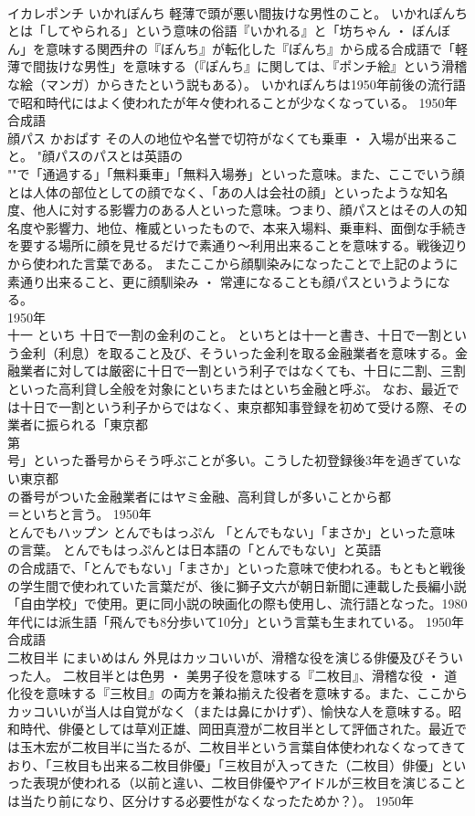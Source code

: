 \documentclass[8pt]{extreport}
\begin{document}
\begin{CJK}{UTF8}{min}
\\	イカレポンチ	いかれぽんち	軽薄で頭が悪い間抜けな男性のこと。	いかれぽんちとは「してやられる」という意味の俗語『いかれる』と「坊ちゃん ・ ぼんぼん」を意味する関西弁の『ぼんち』が転化した『ぽんち』から成る合成語で「軽薄で間抜けな男性」を意味する（『ぽんち』に関しては、『ポンチ絵』という滑稽な絵（マンガ）からきたという説もある）。 いかれぽんちは1950年前後の流行語で昭和時代にはよく使われたが年々使われることが少なくなっている。	1950年	合成語	
\\	顔パス	かおぱす	その人の地位や名誉で切符がなくても乗車 ・ 入場が出来ること。	"顔パスのパスとは英語の
\\	""で「通過する」「無料乗車」「無料入場券」といった意味。また、ここでいう顔とは人体の部位としての顔でなく、「あの人は会社の顔」といったような知名度、他人に対する影響力のある人といった意味。つまり、顔パスとはその人の知名度や影響力、地位、権威といったもので、本来入場料、乗車料、面倒な手続きを要する場所に顔を見せるだけで素通り～利用出来ることを意味する。戦後辺りから使われた言葉である。 またここから顔馴染みになったことで上記のように素通り出来ること、更に顔馴染み ・ 常連になることも顔パスというようになる。
\\	1950年	
\\	十一	といち	十日で一割の金利のこと。	といちとは十一と書き、十日で一割という金利（利息）を取ること及び、そういった金利を取る金融業者を意味する。金融業者に対しては厳密に十日で一割という利子ではなくても、十日に二割、三割といった高利貸し全般を対象にといちまたはといち金融と呼ぶ。 なお、最近では十日で一割という利子からではなく、東京都知事登録を初めて受ける際、その業者に振られる「東京都
\\	第
\\	号」といった番号からそう呼ぶことが多い。こうした初登録後3年を過ぎていない東京都
\\	の番号がついた金融業者にはヤミ金融、高利貸しが多いことから都
\\	＝といちと言う。	1950年	
\\	とんでもハップン	とんでもはっぷん	「とんでもない」「まさか」といった意味の言葉。	とんでもはっぷんとは日本語の「とんでもない」と英語
\\	の合成語で、「とんでもない」「まさか」といった意味で使われる。もともと戦後の学生間で使われていた言葉だが、後に獅子文六が朝日新聞に連載した長編小説「自由学校」で使用。更に同小説の映画化の際も使用し、流行語となった。1980年代には派生語「飛んでも8分歩いて10分」という言葉も生まれている。	1950年	合成語	
\\	二枚目半	にまいめはん	外見はカッコいいが、滑稽な役を演じる俳優及びそういった人。	二枚目半とは色男 ・ 美男子役を意味する『二枚目』、滑稽な役 ・ 道化役を意味する『三枚目』の両方を兼ね揃えた役者を意味する。また、ここからカッコいいが当人は自覚がなく（または鼻にかけず）、愉快な人を意味する。昭和時代、俳優としては草刈正雄、岡田真澄が二枚目半として評価された。最近では玉木宏が二枚目半に当たるが、二枚目半という言葉自体使われなくなってきており、「三枚目も出来る二枚目俳優」「三枚目が入ってきた（二枚目）俳優」といった表現が使われる（以前と違い、二枚目俳優やアイドルが三枚目を演じることは当たり前になり、区分けする必要性がなくなったためか？）。	1950年	

\end{CJK}
\end{document}

